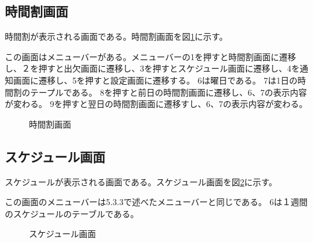\documentclass[a4j,12pt,onecolumn,oneside,titlepage,openany,final]{jreport}
\begin{document}
\subsection{時間割画面}
時間割が表示される画面である。時間割画面を図\ref{time}に示す。

 この画面はメニューバーがある。メニューバーの1を押すと時間割画面に遷移し、２を押すと出欠画面に遷移し、3を押すとスケジュール画面に遷移し、4を通知画面に遷移し、5を押すと設定画面に遷移する。
 6は曜日である。
 7は1日の時間割のテープルである。
8を押すと前日の時間割画面に遷移し、6、7の表示内容が変わる。
9を押すと翌日の時間割画面に遷移すし、6、7の表示内容が変わる。


\begin{figure}[htbp]
  \centering %
  \caption{時間割画面}\label{time}
\end{figure}

\subsection{スケジュール画面}
スケジュールが表示される画面である。スケジュール画面を図\ref{suke}に示す。

この画面のメニューバーは5.3.3で述べたメニューバーと同じである。
6は１週間のスケジュールのテーブルである。

\begin{figure}[htbp]
  \centering %
  \caption{スケジュール画面}\label{suke}
\end{figure}
\end{document}
